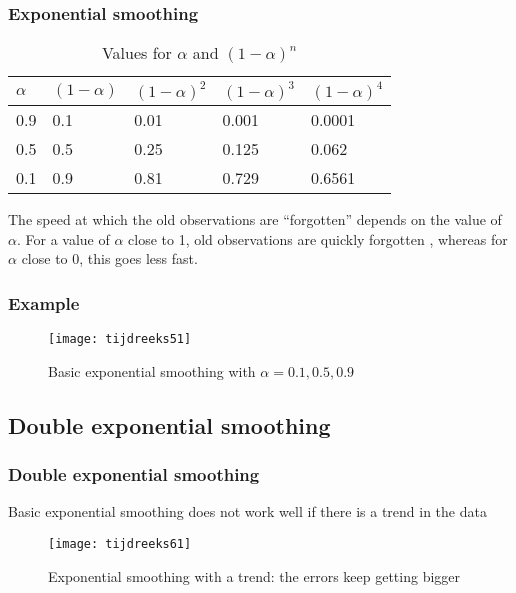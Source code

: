 \documentclass[aspectratio=169]{beamer}
\begin{document}
\begin{frame}
  \frametitle{Exponential smoothing}
  
  \begin{table}
    \centering
    \begin{tabular}{l|llll}
      $\alpha$ & $(1-\alpha)$ & $(1-\alpha)^{2}$ & $(1-\alpha)^{3}$ & $(1-\alpha)^{4}$ \\ \hline
      0.9   & 0.1       & 0.01             & 0.001                      & 0.0001           \\
      0.5   & 0.5       & 0.25             & 0.125                      & 0.062            \\
      0.1   & 0.9       & 0.81             & 0.729                      & 0.6561           \\
    \end{tabular}
    \caption{Values for $\alpha$ and $(1-\alpha)^{n}$}
    \label{tab:alpha}
  \end{table}
  The speed at which the old observations are ``forgotten'' depends on the value of $\alpha$. For a value of $\alpha$ close to 1, old observations are quickly forgotten , whereas for  $\alpha$ close to 0, this goes less fast.
\end{frame}


\begin{frame}
  \frametitle{Example}
  \begin{figure}[htbp]
    \centering
    \texttt{[image: tijdreeks51]}
    \caption{Basic exponential smoothing with $\alpha=0.1 , 0.5, 0.9$}
    \label{fig:tijdreeks51}
  \end{figure}
\end{frame}

\subsection{Double exponential smoothing}

\begin{frame}
  \frametitle{Double exponential smoothing}
  
  Basic exponential smoothing does not work well if there is a trend in the data
  
  \begin{figure}
    \centering
    \texttt{[image: tijdreeks61]}
    \caption{Exponential smoothing with a trend: the errors keep getting bigger}
    \label{fig:tijdreeks61}
  \end{figure}
  
\end{frame}
\end{document}
